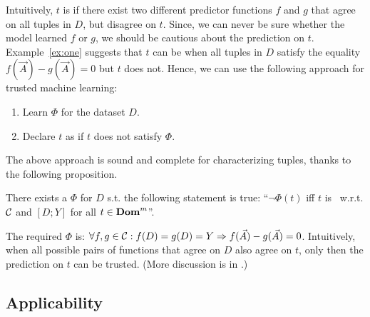 Intuitively, $t$ is \nc if there exist two different predictor functions $f$
and $g$ that agree on all tuples in $D$, but disagree on $t$. Since, we can
never be sure whether the model learned $f$ or $g$, we should be cautious about
the prediction on $t$. Example~\ref{ex:one} suggests that $t$ can be \nc when
all tuples in $D$ satisfy the equality \di $f(\vec{A}) - g(\vec{A}) = 0$ but
$t$ does not. Hence, we can use the following approach for trusted machine
learning:
%
\begin{enumerate}
	\addtolength{\itemindent}{1cm}
	\item  Learn \dis $\Phi$ for the dataset $D$.
	\item  Declare $t$ as \nc if $t$ does not satisfy $\Phi$.
\end{enumerate}
\smallskip

The above approach is sound and complete for characterizing \nc tuples, thanks
to the following proposition.


\begin{proposition}\label{PROP:EXISTENCE}
    There exists a \di $\Phi$ for $D$ s.t. the following statement
    is true: ``$\neg\Phi(t)$ iff $t$ is \nc\ w.r.t. $\mathcal{C}$ and $[D ; Y]$ for all $t \in \mathbf{Dom}^m$''.
\end{proposition}

The required \di $\Phi$ is: $\forall{f,g\in\mathcal{C}}:f(D)=g(D)=Y \Rightarrow
f(\vec{A}) - g(\vec{A}) = 0$.
Intuitively, when all possible pairs of functions that agree on $D$ also agree
on $t$, only then the prediction on $t$ can be trusted. (More discussion is in
\appOrTechRep.)


\subsection{Applicability}\label{applicability}


